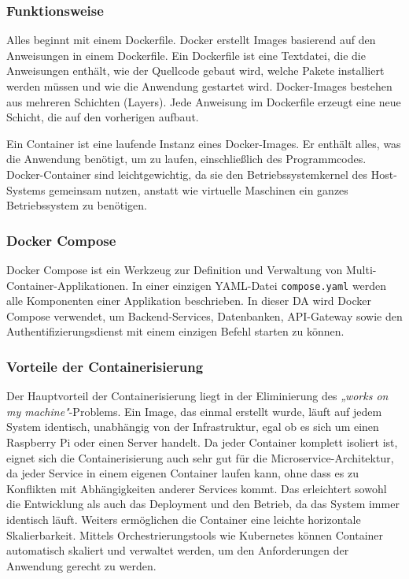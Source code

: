 \newpage

\subsubsection{Funktionsweise}
Alles beginnt mit einem Dockerfile. Docker erstellt Images basierend auf den Anweisungen in einem Dockerfile. Ein Dockerfile ist eine Textdatei, die die Anweisungen enthält, 
wie der Quellcode gebaut wird, welche Pakete installiert werden müssen und wie die Anwendung gestartet wird. Docker-Images bestehen aus mehreren Schichten (Layers). 
Jede Anweisung im Dockerfile erzeugt eine neue Schicht, die auf den vorherigen aufbaut.\cite{docker_dockerfile}

Ein Container ist eine laufende Instanz eines Docker-Images. Er enthält alles, was die Anwendung benötigt, um zu laufen, einschließlich des Programmcodes.
Docker-Container sind leichtgewichtig, da sie den Betriebssystemkernel des Host-Systems gemeinsam nutzen, anstatt wie virtuelle Maschinen ein ganzes Betriebssystem zu benötigen.\cite{docker_overview}

\subsubsection{Docker Compose}
Docker Compose ist ein Werkzeug zur Definition und Verwaltung von Multi-Container-Applikationen. In einer einzigen YAML-Datei
\texttt{compose.yaml} werden alle Komponenten einer Applikation beschrieben.\cite{docker_compose} 
In dieser \gls{DA} wird Docker Compose verwendet, um Backend-Services, Datenbanken, \gls{API}-Gateway sowie
den Authentifizierungsdienst mit einem einzigen Befehl starten zu können.

\subsubsection{Vorteile der Containerisierung}
Der Hauptvorteil der Containerisierung liegt in der Eliminierung des \textit{„works on my machine"}-Problems. 
Ein Image, das einmal erstellt wurde, läuft auf jedem System identisch, unabhängig von der Infrastruktur, egal ob es sich um einen Raspberry Pi oder einen Server handelt.
Da jeder Container komplett isoliert ist, eignet sich die Containerisierung auch sehr gut für die Microservice-Architektur, da jeder Service in einem eigenen Container laufen kann,
ohne dass es zu Konflikten mit Abhängigkeiten anderer Services kommt.
Das erleichtert sowohl die Entwicklung als auch das Deployment und den Betrieb, da das System immer identisch läuft.
Weiters ermöglichen die Container eine leichte horizontale Skalierbarkeit. Mittels Orchestrierungstools wie Kubernetes können Container automatisch skaliert 
und verwaltet werden, um den Anforderungen der Anwendung gerecht zu werden.

